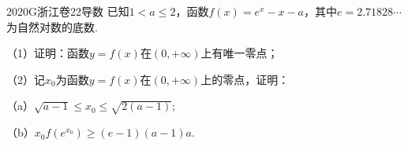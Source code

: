 
\begin{problem}{2020}{G}{浙江卷}{22}{导数}
已知$1<a\leq2$，函数$f(x)=e^x -x -a$，其中$e=2.71828\cdots$为自然对数的底数.

（1）证明：函数$y=f(x)$在$(0,+\infty)$上有唯一零点；

（2）记$x_0$为函数$y=f(x)$在$(0,+\infty)$上的零点，证明：

（a）$\sqrt{a-1}\leq x_0\leq\sqrt{2(a-1)}$;

（b）$x_0f(e^{x_0})\geq(e-1)(a-1)a$.
\end{problem}
